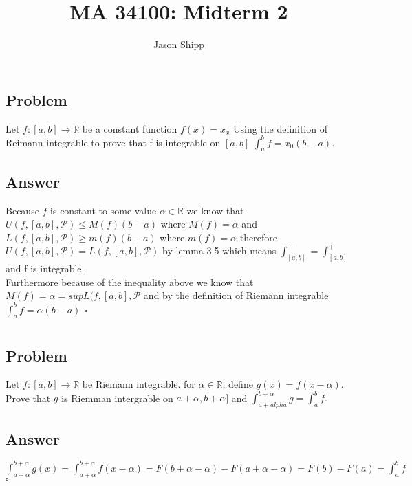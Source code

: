 \documentclass{article}
\newcommand\tab[1][1cm]{\hspace*{#1}}
\begin{document}
\title{MA 34100: Midterm 2}
\author{Jason Shipp}
\maketitle

\section{}

\subsection*{Problem}
Let \(f:[a,b] \to \mathbb{R}\) be a constant function \(f(x) = x_{x}\) Using the definition of Reimann integrable to prove that f is integrable on 
\([a,b]\) \(\int^{b}_{a}f = x_{0}(b-a)\).

\subsection*{Answer}
Because \(f\) is constant to some value \(\alpha \in \mathbb{R}\) we know
that \(U(f, [a,b],\mathcal{P}) \leq M(f)(b-a)\) where \(M(f) = \alpha\)
and \(L(f, [a,b], \mathcal{P}) \geq m(f)(b-a)\) where \(m(f) = \alpha\)
therefore \(U(f, [a,b],\mathcal{P}) = L(f, [a,b],\mathcal{P})\) by lemma 3.5
which means \(\int^{-}_{[a,b]} = \int^{+}_{[a,b]}\) and f is integrable. \\
Furthermore because of the inequality above we know that \(M(f) = \alpha = 
supL(f, [a,b], \mathcal{P}\) and by the definition of Riemann integrable
\(\int_{a}^{b} f = \alpha(b-a)\) \tab \(\square\)


\section{}

\subsection*{Problem}
Let \(f:[a,b] \to \mathbb{R}\) be Riemann integrable. for \(\alpha \in 
\mathbb{R}\), define \(g(x) = f(x-\alpha)\). Prove that \(g\) is Riemman
intergrable on \(a + \alpha, b + \alpha]\) and \(\int^{b+\alpha}_{a+alpha}g = \int^{b}_{a}f.\)

\subsection*{Answer}
\(\int^{b+\alpha}_{a + \alpha}g(x) = \int^{b+\alpha}_{a + \alpha}f(x-\alpha)
= F(b + \alpha - \alpha) - F(a + \alpha - \alpha) = F(b) - F(a) = 
\int^{b}_{a}f\) \tab \(\square\)
\end{document}
